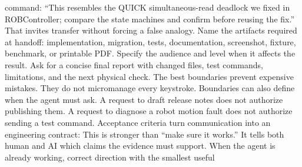 {}command: “This resembles the QUICK simultaneous-read deadlock we fixed in\markdownRendererSoftLineBreak
{}ROBController; compare the state machines and confirm before reusing the fix.”\markdownRendererSoftLineBreak
{}That invites transfer without forcing a false analogy.\markdownRendererInterblockSeparator
{}
\markdownRendererSectionEnd \markdownRendererSectionBegin
{}\markdownRendererInterblockSeparator
{}Name the artifacts required at handoff: implementation, migration, tests,\markdownRendererSoftLineBreak
{}documentation, screenshot, fixture, benchmark, or printable PDF. Specify the\markdownRendererSoftLineBreak
{}audience and level when it affects the result. Ask for a concise final report\markdownRendererSoftLineBreak
{}with changed files, test commands, limitations, and the next physical check.\markdownRendererInterblockSeparator
{}
\markdownRendererSectionEnd \markdownRendererSectionBegin
{}\markdownRendererInterblockSeparator
{}The best boundaries prevent expensive mistakes. They do not micromanage every\markdownRendererSoftLineBreak
{}keystroke.\markdownRendererInterblockSeparator
{}\markdownRendererInterblockSeparator
{}Boundaries can also define when the agent must ask. A request to draft release\markdownRendererSoftLineBreak
{}notes does not authorize publishing them. A request to diagnose a robot motion\markdownRendererSoftLineBreak
{}fault does not authorize sending a test command.\markdownRendererInterblockSeparator
{}
\markdownRendererSectionEnd \markdownRendererSectionBegin
{}\markdownRendererInterblockSeparator
{}Acceptance criteria turn communication into an engineering contract:\markdownRendererInterblockSeparator
{}\markdownRendererInterblockSeparator
{}This is stronger than “make sure it works.” It tells both human and AI which\markdownRendererSoftLineBreak
{}claims the evidence must support.\markdownRendererInterblockSeparator
{}
\markdownRendererSectionEnd \markdownRendererSectionBegin
{}\markdownRendererInterblockSeparator
{}When the agent is already working, correct direction with the smallest useful\markdownRendererSoftLineBreak
